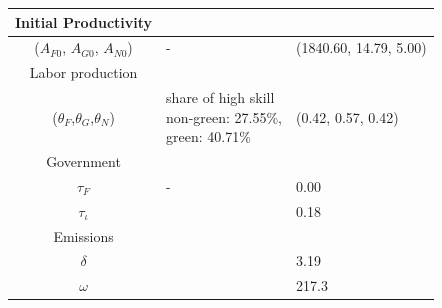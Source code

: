 \begin{table}[h!]
\begin{center}
{\begin{tabular}{c|ll}
 			\hline
 			Initial Productivity&\multicolumn{2}{c}{}\\
 			\hline
 			($A_{F0}$, $A_{G0}$, $A_{N0}$)&- &(1840.60, 14.79, 5.00)  \\
 			\hline 
 				Labor production&\multicolumn{2}{c}{}\\ 			
 			\hline
 			($\theta_F$,$\theta_G$,$\theta_N$)&\makecell[l]{share of high skill\\ non-green: 27.55\%,\\ green: 40.71\% \citep{Consoli2016DoCapital} }& (0.42, 0.57, 0.42)\\
 			\hline
 			Government&\multicolumn{2}{c}{}\\
 			\hline
 			$\tau_F$&- &0.00\\
 			$\tau_\iota$&\cite{Heathcote2017OptimalFramework} &0.18\\
 			\hline
 			Emissions&\multicolumn{2}{c}{}\\
 			\hline
 			$\delta$& \makecell[l]{\cite{EPAems}}&3.19\\
 			$\omega$& \cite{EPAems}&217.3\\
 			\hline \hline
 		\end{tabular}
 	}
 	\end{center}
 \end{table}
 
 
 
 




